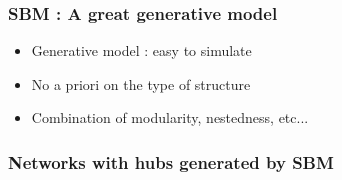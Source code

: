 \documentclass[compress,10pt]{beamer}
\begin{document}
\begin{frame}
\frametitle{SBM : A great generative model}

\begin{itemize}
\item  Generative model : easy to simulate
\item No a priori on the type of structure
\item Combination of modularity, nestedness, etc... 
\end{itemize}
\end{frame}


\begin{frame}
\frametitle{Networks with hubs generated by SBM}


\end{frame}
\end{document}
